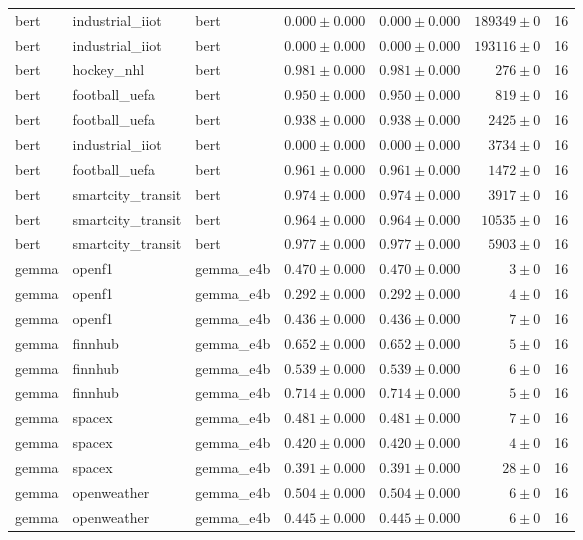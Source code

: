 \begin{table}[htbp]
\begin{tabular}{l l l r r r r}
bert & industrial\_iiot & bert & $0.000\pm0.000$ & $0.000\pm0.000$ & $189349\pm0$ & 16 \\
bert & industrial\_iiot & bert & $0.000\pm0.000$ & $0.000\pm0.000$ & $193116\pm0$ & 16 \\
bert & hockey\_nhl & bert & $0.981\pm0.000$ & $0.981\pm0.000$ & $276\pm0$ & 16 \\
bert & football\_uefa & bert & $0.950\pm0.000$ & $0.950\pm0.000$ & $819\pm0$ & 16 \\
bert & football\_uefa & bert & $0.938\pm0.000$ & $0.938\pm0.000$ & $2425\pm0$ & 16 \\
bert & industrial\_iiot & bert & $0.000\pm0.000$ & $0.000\pm0.000$ & $3734\pm0$ & 16 \\
bert & football\_uefa & bert & $0.961\pm0.000$ & $0.961\pm0.000$ & $1472\pm0$ & 16 \\
bert & smartcity\_transit & bert & $0.974\pm0.000$ & $0.974\pm0.000$ & $3917\pm0$ & 16 \\
bert & smartcity\_transit & bert & $0.964\pm0.000$ & $0.964\pm0.000$ & $10535\pm0$ & 16 \\
bert & smartcity\_transit & bert & $0.977\pm0.000$ & $0.977\pm0.000$ & $5903\pm0$ & 16 \\
gemma & openf1 & gemma\_e4b & $0.470\pm0.000$ & $0.470\pm0.000$ & $3\pm0$ & 16 \\
gemma & openf1 & gemma\_e4b & $0.292\pm0.000$ & $0.292\pm0.000$ & $4\pm0$ & 16 \\
gemma & openf1 & gemma\_e4b & $0.436\pm0.000$ & $0.436\pm0.000$ & $7\pm0$ & 16 \\
gemma & finnhub & gemma\_e4b & $0.652\pm0.000$ & $0.652\pm0.000$ & $5\pm0$ & 16 \\
gemma & finnhub & gemma\_e4b & $0.539\pm0.000$ & $0.539\pm0.000$ & $6\pm0$ & 16 \\
gemma & finnhub & gemma\_e4b & $0.714\pm0.000$ & $0.714\pm0.000$ & $5\pm0$ & 16 \\
gemma & spacex & gemma\_e4b & $0.481\pm0.000$ & $0.481\pm0.000$ & $7\pm0$ & 16 \\
gemma & spacex & gemma\_e4b & $0.420\pm0.000$ & $0.420\pm0.000$ & $4\pm0$ & 16 \\
gemma & spacex & gemma\_e4b & $0.391\pm0.000$ & $0.391\pm0.000$ & $28\pm0$ & 16 \\
gemma & openweather & gemma\_e4b & $0.504\pm0.000$ & $0.504\pm0.000$ & $6\pm0$ & 16 \\
gemma & openweather & gemma\_e4b & $0.445\pm0.000$ & $0.445\pm0.000$ & $6\pm0$ & 16 \\

\end{tabular}
\end{table}
